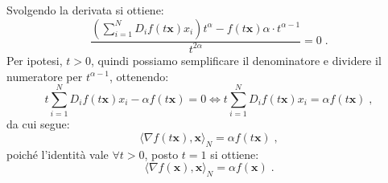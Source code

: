\documentclass[a4paper,12pt]{report}
\theoremstyle{plain}
\theoremstyle{definition}
\theoremstyle{remark}
\numberwithin{equation}{section}
\begin{document}
Svolgendo la derivata si ottiene:
\begin{equation}
\frac{\left(\sum_{i=1}^N D_if(t\mathbf{x})x_i\right)t^{\alpha}-f(t\mathbf{x})\alpha\cdot t^{\alpha-1}}{t^{2\alpha}}=0\;.
\end{equation}
Per ipotesi, $t>0$, quindi possiamo semplificare il denominatore e dividere il numeratore per $t^{\alpha-1}$, ottenendo:
\begin{equation}
t\sum_{i=1}^N D_if(t\mathbf{x})x_i-\alpha f(t\mathbf{x})=0 \Longleftrightarrow t\sum_{i=1}^N D_if(t\mathbf{x})x_i=\alpha f(t\mathbf{x})\;,
\end{equation}
da cui segue:
\begin{equation}
\langle \nabla f(t\mathbf{x}),\mathbf{x}\rangle_N=\alpha f(t\mathbf{x})\;,
\end{equation}
poiché l'identità vale $\forall t>0$, posto $t=1$ si ottiene:
\begin{equation}
\langle \nabla f(\mathbf{x}),\mathbf{x}\rangle_N=\alpha f(\mathbf{x})\;.
\end{equation}
\endproof
\end{document}
